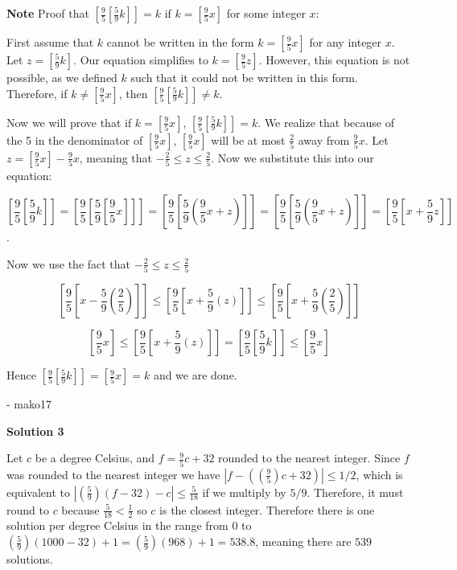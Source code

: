 \begin{enumerate}
 \textbf{Note} Proof that $\left[ \frac{9}{5} \left[ \frac{5}{9} k \right] \right] = k$ if $k=\left[ \frac{9}{5}x\right]$ for some integer $x$:

 First assume that $k$ cannot be written in the form $k=\left[ \frac{9}{5}x\right]$ for any integer $x$. Let $z = \left[ \frac{5}{9}k\right]$. Our equation simplifies to $k = \left[ \frac{9}{5}z\right]$. However, this equation is not possible, as we defined $k$ such that it could not be written in this form. Therefore, if $k \neq \left[ \frac{9}{5}x\right]$, then $\left[ \frac{9}{5} \left[ \frac{5}{9} k \right] \right] \neq k$.

 Now we will prove that if $k = \left[ \frac{9}{5}x\right]$, $\left[ \frac{9}{5} \left[ \frac{5}{9} k \right] \right] = k$. We realize that because of the 5 in the denominator of $\left[ \frac{9}{5}x \right]$, $\left[ \frac{9}{5}x \right]$ will be at most $\frac{2}{5}$ away from $\frac{9}{5}x$. Let $z = \left[ \frac{9}{5}x \right]- \frac{9}{5}x$, meaning that $-\frac{2}{5} \leq z \leq \frac{2}{5}$. Now we substitute this into our equation:

 
 \[\left[ \frac{9}{5} \left[ \frac{5}{9} k \right] \right] = \left[ \frac{9}{5} \left[ \frac{5}{9} \left[ \frac{9}{5}x\right] \right] \right] = \left[ \frac{9}{5} \left[ \frac{5}{9} (\frac{9}{5}x + z) \right] \right] = \left[ \frac{9}{5} \left[ \frac{5}{9} (\frac{9}{5}x + z) \right] \right] = \left[ \frac{9}{5} \left[ x+ \frac{5}{9}z \right] \right]\].

 Now we use the fact that $-\frac{2}{5} \leq z \leq \frac{2}{5}$

 \[\left[ \frac{9}{5} \left[ x - \frac{5}{9}(\frac{2}{5}) \right] \right] \leq \left[ \frac{9}{5} \left[ x + \frac{5}{9}(z) \right] \right] \leq \left[ \frac{9}{5} \left[ x + \frac{5}{9}(\frac{2}{5}) \right] \right]\]

 \[\left[ \frac{9}{5} x \right] \leq \left[ \frac{9}{5} \left[ x + \frac{5}{9}(z) \right] \right] = \left[ \frac{9}{5} \left[ \frac{5}{9}k \right] \right] \leq \left[ \frac{9}{5}x \right]\]

 Hence $\left[ \frac{9}{5} \left[ \frac{5}{9}k \right] \right] = \left[ \frac{9}{5}x \right] = k$ and we are done.

 - mako17

 



\textbf{Solution 3}

Let $c$ be a degree Celsius, and $f=\frac 95c+32$ rounded to the nearest integer. Since $f$ was rounded to the nearest integer we have $|f-((\frac 95)c+32)|\leq 1/2$, which is equivalent to $|(\frac 59)(f-32)-c|\leq \frac 5{18}$ if we multiply by $5/9$. Therefore, it must round to $c$ because $\frac 5{18}<\frac 12$ so $c$ is the closest integer. Therefore there is one solution per degree Celsius in the range from $0$ to $(\frac 59)(1000-32) + 1=(\frac 59)(968) + 1=538.8$, meaning there are $539$ solutions.


\end{enumerate}
